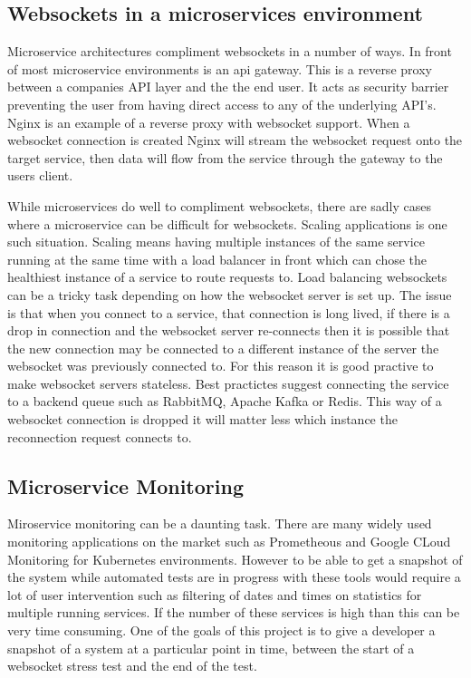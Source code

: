 \subsection{Websockets in a microservices environment}

Microservice architectures compliment websockets in a number of ways. In front of most microservice environments is an api gateway\cite{6885428}. This is a reverse proxy between a companies API layer and the the end user. It acts as security barrier preventing the user from having direct access to any of the underlying API's. Nginx is an example of a reverse proxy with websocket support. When a websocket connection is created Nginx will stream the websocket request onto the target service, then data will flow from the service through the gateway to the users client. 

While microservices do well to compliment websockets, there are sadly cases where a microservice can be difficult for websockets. Scaling applications is one such situation. Scaling means having multiple instances of the same service running at the same time with a load balancer in front which can chose the healthiest instance of a service to route requests to. Load balancing websockets can be a tricky task depending on how the websocket server is set up. The issue is that when you connect to a service, that connection is long lived, if there is a drop in connection and the websocket server re-connects then it is possible that the new connection may be connected to a different instance of the server the websocket was previously connected to. For this reason it is good practive to make websocket servers stateless. Best practictes suggest connecting the service to a backend queue such as RabbitMQ, Apache Kafka or Redis. This way of a websocket connection is dropped it will matter less which instance the reconnection request connects to.

\subsection{Microservice Monitoring}

Miroservice monitoring can be a daunting task\cite{7958458}. There are many widely used monitoring applications on the market such as Prometheous and Google CLoud Monitoring for Kubernetes environments. However to be able to get a snapshot of the system while automated tests are in progress with these tools would require a lot of user intervention such as filtering of dates and times on statistics for multiple running services. If the number of these services is high than this can be very time consuming. One of the goals of this project is to give a developer a snapshot of a system at a particular point in time, between the start of a websocket stress test and the end of the test.